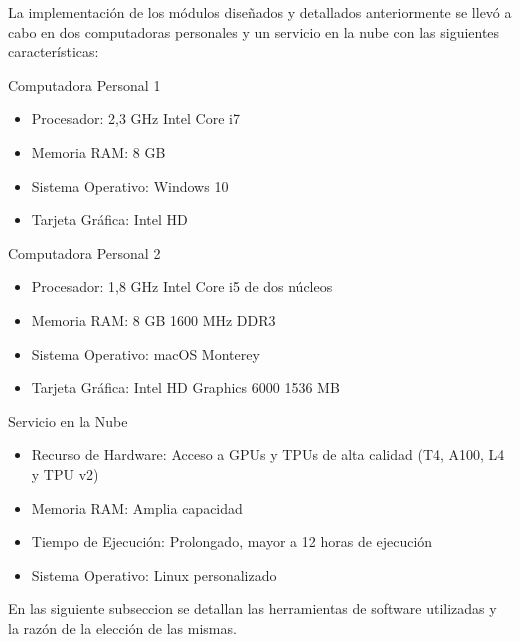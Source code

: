 La implementación de los módulos diseñados y detallados anteriormente se llevó a cabo en dos computadoras personales y un servicio en la nube con las siguientes características:

Computadora Personal 1

\begin{itemize}

\item Procesador: 2,3 GHz Intel Core i7 
\item Memoria RAM: 8 GB
\item Sistema Operativo: Windows 10
\item Tarjeta Gráfica: Intel HD 

\end{itemize}

Computadora Personal 2

\begin{itemize}

\item Procesador: 1,8 GHz Intel Core i5 de dos núcleos
\item Memoria RAM: 8 GB 1600 MHz DDR3
\item Sistema Operativo: macOS Monterey
\item Tarjeta Gráfica: Intel HD Graphics 6000 1536 MB

\end{itemize}

Servicio en la Nube

\begin{itemize}

\item Recurso de Hardware: Acceso a GPUs y TPUs de alta calidad (T4, A100, L4 y TPU v2)
\item Memoria RAM: Amplia capacidad
\item Tiempo de Ejecución: Prolongado, mayor a 12 horas de ejecución
\item Sistema Operativo: Linux personalizado

\end{itemize}

En las siguiente subseccion se detallan las herramientas de software utilizadas y la razón de la elección de las mismas.